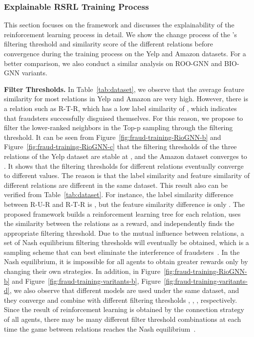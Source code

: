 \subsubsection{Explainable RSRL Training Process}\label{sec:fraud-explainable}
This section focuses on the \RSRL framework and discusses the explainability of the reinforcement learning process in detail.
We show the change process of the \RioGNN's filtering threshold and similarity score of the different relations before convergence during the training process on the Yelp and Amazon datasets.
For a better comparison, we also conduct a similar analysis on ROO-GNN and BIO-GNN variants.


\textbf{Filter Thresholds. }
In Table~\ref{tab:dataset}, we observe that the average feature similarity for most relations in Yelp and Amazon are very high.
However, there is a relation such as R-T-R, which has a low label similarity of , which indicates that fraudsters successfully disguised themselves.
For this reason, we propose to filter the lower-ranked neighbors in the Top-p sampling through the filtering threshold.
It can be seen from Figure~\ref{fig:fraud-training-RioGNN-b} and Figure~\ref{fig:fraud-training-RioGNN-c} that the filtering thresholds of the three relations of the Yelp dataset are stable at , and the Amazon dataset converges to .
It shows that the filtering thresholds for different relations eventually converge to different values.
The reason is that the label similarity and feature similarity of different relations are different in the same dataset.
This result also can be verified from Table~\ref{tab:dataset}.
For instance, the label similarity difference between R-U-R and R-T-R is , but the feature similarity difference is only .
The proposed framework builds a reinforcement learning tree for each relation, uses the similarity between the relations as a reward, and independently finds the appropriate filtering threshold.
Due to the mutual influence between relations, a set of Nash equilibrium filtering thresholds will eventually be obtained, which is a sampling scheme that can best eliminate the interference of fraudsters~\cite{dou2020robust}.
In the Nash equilibrium, it is impossible for all agents to obtain greater rewards only by changing their own strategies.
In addition, in Figure~\ref{fig:fraud-training-RioGNN-b} and Figure~\ref{fig:fraud-training-varitants-b}, Figure~\ref{fig:fraud-training-varitants-d}, we also observe that different models are used under the same dataset, and they converge and combine with different filtering thresholds , , , respectively.
Since the result of reinforcement learning is obtained by the connection strategy of all agents, there may be many different filter threshold combinations at each time the game between relations reaches the Nash equilibrium~\cite{junling1998rlmultinash,pozo2011multinash}.


